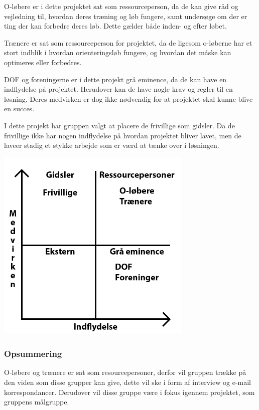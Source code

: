 O-løbere er i dette projektet sat som ressourceperson, da de kan give råd og vejledning til, hvordan deres træning og løb fungere, samt undersøge om der er ting der kan forbedre deres løb. Dette gælder både inden- og efter løbet.

Trænere er sat som ressourceperson for projektet, da de ligesom o-løberne har et stort indblik i hvordan orienteringsløb fungere, og hvordan det måske kan optimeres eller forbedres. 

DOF og foreningerne er i dette projekt grå eminence, da de kan have en indflydelse på projektet. Herudover kan de have nogle krav og regler til en løsning. Deres medvirken er dog ikke nødvendig for at projektet skal kunne blive en succes.

I dette projekt har gruppen valgt at placere de frivillige som gidsler. Da de frivillige ikke har nogen indflydelse på hvordan projektet bliver lavet, men de laveer stadig et stykke arbejde som er værd at tænke over i løsningen.    

\includegraphics[width=0.70\textwidth]{billeder/Prio}
\vspace{0.20cm}

\subsubsection{Opsummering}
O-løbere og trænere er sat som resourcepersoner, derfor vil gruppen trække på den viden som disse grupper kan give, dette vil ske i form af interview og e-mail korrespondancer. Derudover vil disse gruppe være i fokus igennem projektet, som gruppens målgruppe. 
